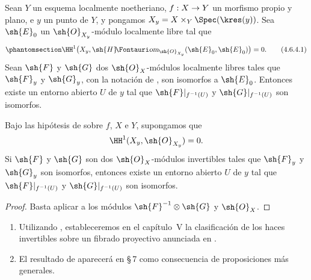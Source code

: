 \documentclass[oneside]{amsart}
\makeatletter
\newcommand{\ega@arrow}[2]{\mathchoice{#1}{#2}{#2}{#2}}
\renewcommand{\to}{\ega@arrow{\longrightarrow}{\rightarrow}}
\newcommand*{\ega@sheafop}[3]{\sh{#1}#2\textup{\kern-2.2pt{\Fontauri\slshape #3}}}
\newcommand*{\shHom}{\ega@sheafop{H}{}{om}}
\let\EGAOriginalLabel\label
\renewcommand{\label}[1]{\phantomsection\EGAOriginalLabel{#1}}
\makeatother
\begin{document}
\begin{corollary}[4.6.4]
\label{III.4.6.4}
Sean $Y$ un esquema localmente noetheriano, $f:X\to Y$ un
morfismo propio y plano, e $y$ un punto de $Y$, y pongamos
$X_y=X\times_Y\Spec(\kres(y))$. Sea $\sh{E}_0$ un
$\sh{O}_{X_y}$-módulo localmente libre tal que
\[
\label{III.4.6.4.1}
  \HH^1\bigl(
    X_y,\shHom_{\sh{O}_{X_y}}(\sh{E}_0,\sh{E}_0)
  \bigr)=0.
  \tag{4.6.4.1}
\]
Sean $\sh{F}$ y $\sh{G}$ dos $\sh{O}_X$-módulos localmente libres
tales que $\sh{F}_y$ y $\sh{G}_y$, con la notación de
, son isomorfos a $\sh{E}_0$. Entonces existe un
entorno abierto $U$ de $y$ tal que
$\sh{F}|_{f^{-1}(U)}$ y $\sh{G}|_{f^{-1}(U)}$ son isomorfos.
\end{corollary}

\begin{corollary}[4.6.5]
\label{III.4.6.5}
Bajo las hipótesis de  sobre $f$, $X$ e $Y$,
supongamos que
\[
  \HH^1(X_y,\sh{O}_{X_y})=0.
\]
Si $\sh{F}$ y $\sh{G}$ son dos $\sh{O}_X$-módulos invertibles tales
que $\sh{F}_y$ y $\sh{G}_y$ son isomorfos, entonces existe un entorno
abierto $U$ de $y$ tal que $\sh{F}|_{f^{-1}(U)}$ y
$\sh{G}|_{f^{-1}(U)}$ son isomorfos.
\end{corollary}

\begin{proof}
Basta aplicar  a los módulos
$\sh{F}^{-1}\otimes\sh{G}$ y $\sh{O}_X$.
\end{proof}

\begin{remarks}[4.6.6]
\label{III.4.6.6}
\begin{enumerate}
\item[(i)] Utilizando , estableceremos en el capítulo~V
  la clasificación de los haces invertibles sobre un fibrado proyectivo
  anunciada en .
\item[(ii)] El resultado de  aparecerá en \S\,7 como
  consecuencia de proposiciones más generales.
\end{enumerate}
\end{remarks}
\end{document}
